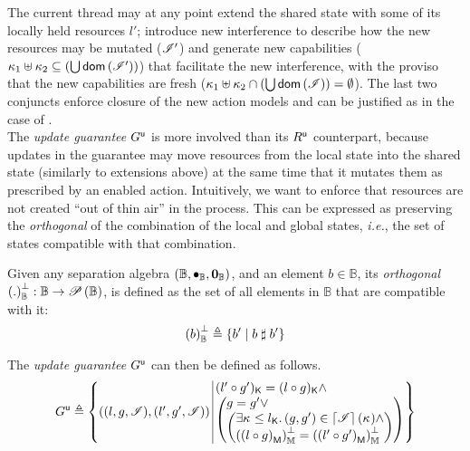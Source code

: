 %
The current thread may at any point extend the shared state with some of its locally held resources $l'$; introduce new interference to describe how the new resources may be mutated ($\mathscr{I}'$) and generate new capabilities ($\kappa_{1} \uplus \kappa_{2} \subseteq \left(\bigcup \textsf{dom}\left( \mathscr{I}' \right)\right)$) that facilitate the new interference, with the proviso that the new capabilities are fresh ($\kappa_{1} \uplus \kappa_{2}  \cap \left(\bigcup \textsf{dom}\left( \mathscr{I} \right)\right) = \emptyset$). The last two conjuncts enforce closure of the new action models and can be justified as in the case of \extendR.\\



The \emph{update guarantee} $G^{\textsf{u}}$ is more involved than its $R^{\textsf{u}}$ counterpart, because updates in the guarantee may move resources from the local state into the shared state (similarly to extensions above) at the same time that it mutates them as prescribed by an enabled action. Intuitively, we want to enforce that resources
are not created ``out of thin air'' in the process. This can be expressed as preserving the \emph{orthogonal} of the combination of the local and global states, \textit{i.e.}, the set of states compatible with that combination.
%
\begin{definition}[Orthogonal]\label{def:orthogonal}
Given any separation algebra $(\mathbb{B}, \bullet_{\mathbb{B}}, \mathbf{0}_{\mathbb{B}})$, and an element $b \in \mathbb{B}$, its \emph{orthogonal} $\left( .\right)_{\mathbb{B}}^{\bot} : \mathbb{B} \rightarrow \mathscr{P}\left(\mathbb{B} \right)$, is defined as the set of all elements in $\mathbb{B}$ that are compatible with it:
%
\[
	\left( b\right)_{\mathbb{B}}^{\bot} \triangleq \left\{ b' \mid b \mathrel{\sharp} b' \right\}
\]
\end{definition}
%
The \emph{update guarantee} $G^{\textsf{u}}$ can then be defined as follows. 
%
\[
	\updateG \eqdef
 	\left\{
	\begin{array}{@{} l @{\hspace*{2pt}} | @{\hspace*{2pt}} r @{}}
	  \left(
	     	(l, g, \lmod),
	     	(l', g', \lmod)
		\right)
  	&
  	\begin{array}{@{} l @{} }
  		\capPart{(l' \composeL g')}  = \capPart{(l \composeL g)} \land\\
	  	\left(
	  	\begin{array}{@{} l @{} }
	 		g = g' \lor\\
	 	  	\left(
	 	  	\begin{array}{@{} l @{}}
	 	  		\exsts{\ca{} \leq \capPart{l}}
	 	  		(g, g') \in \padAM{\lmod}(\ca{}) \land\\
	 	  	
	 	  	\ortH{\heapPart{\left(l \composeL g\right)}} = 
	 	  	\ortH{\heapPart{\left(l' \composeL g'\right)}}
	 	  	\end{array}	
	 	  	\right)
	 	\end{array}
   		\right)
   		\end{array}
 	\end{array}
	\right\}
\]
